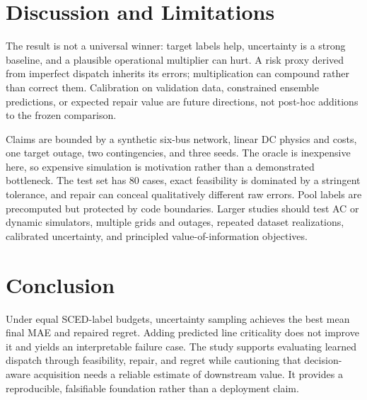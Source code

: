 \documentclass[11pt]{article}
\begin{document}
\section{Discussion and Limitations}
The result is not a universal winner: target labels help, uncertainty is a strong baseline, and a plausible operational multiplier can hurt. A risk proxy derived from imperfect dispatch inherits its errors; multiplication can compound rather than correct them. Calibration on validation data, constrained ensemble predictions, or expected repair value are future directions, not post-hoc additions to the frozen comparison.

Claims are bounded by a synthetic six-bus network, linear DC physics and costs, one target outage, two contingencies, and three seeds. The oracle is inexpensive here, so expensive simulation is motivation rather than a demonstrated bottleneck. The test set has 80 cases, exact feasibility is dominated by a stringent tolerance, and repair can conceal qualitatively different raw errors. Pool labels are precomputed but protected by code boundaries. Larger studies should test AC or dynamic simulators, multiple grids and outages, repeated dataset realizations, calibrated uncertainty, and principled value-of-information objectives.

\section{Conclusion}
Under equal SCED-label budgets, uncertainty sampling achieves the best mean final MAE and repaired regret. Adding predicted line criticality does not improve it and yields an interpretable failure case. The study supports evaluating learned dispatch through feasibility, repair, and regret while cautioning that decision-aware acquisition needs a reliable estimate of downstream value. It provides a reproducible, falsifiable foundation rather than a deployment claim.


\end{document}
